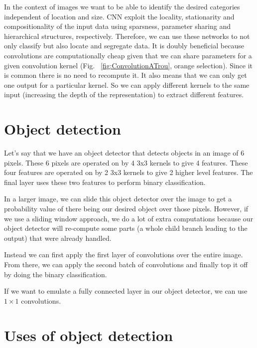 \vspace{2mm}
\noindent
In the context of images we want to be able to identify the desired categories independent of location and size. CNN exploit the locality, stationarity and compositionality of the input data using sparsness, parameter sharing and hierarchical structures, respectively. 
Therefore, we can use these networks to not only classify but also locate and segregate data. 
It is doubly beneficial because convolutions are computationally cheap given that we can share parameters for a given convolution kernel (Fig. ~\ref{fig:ConvolutionATrou}, orange selection). Since it is common there is no need to recompute it. It also means that we can only get one output for a particular kernel. So we can apply different kernels to the same input (increasing the depth of the representation) to extract different features. 

\section{Object detection}

Let's say that we have an object detector that detects objects in an image of 6 pixels.
These 6 pixels are operated on by 4 3x3 kernels to give 4 features.
These four features are operated on by 2 3x3 kernels to give 2 higher level features.
The final layer uses these two features to perform binary classification.

In a larger image, we can slide this object detector over the image to get a probability value of there being our desired object over those pixels. However, if we use a sliding window approach, we do a lot of extra computations because our object detector will re-compute some parts (a whole child branch leading to the output) that were already handled.

Instead we can first apply the first layer of convolutions over the entire image.
From there, we can apply the second batch of convolutions and finally top it off by doing the binary classification.

If we want to emulate a fully connected layer in our object detector, we can use $1\times1$ convolutions.

\section{Uses of object detection}

